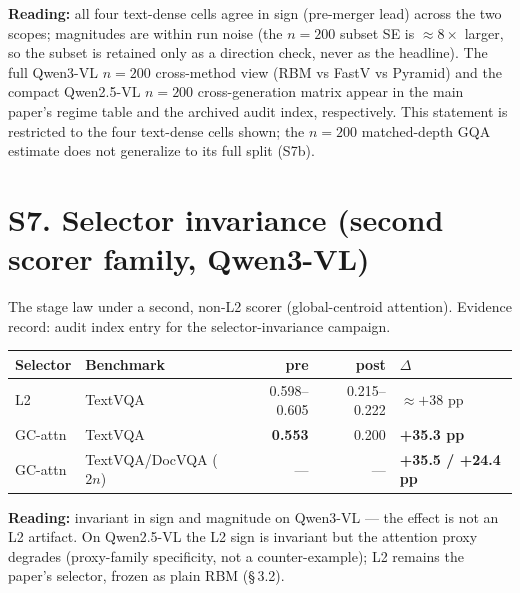 \noindent\textbf{Reading:} all four text-dense cells agree in sign (pre-merger
lead) across the two scopes; magnitudes are within run noise (the $n = 200$
subset SE is $\approx 8\times$ larger, so the subset is retained only as a
direction check, never as the headline). The full Qwen3-VL $n = 200$
cross-method view (RBM vs FastV vs Pyramid) and the compact Qwen2.5-VL
$n = 200$ cross-generation matrix appear in the main paper's regime table and
the archived audit index, respectively. This statement is restricted to the
four text-dense cells shown; the $n=200$ matched-depth GQA estimate does not
generalize to its full split (S7b).

\section*{S7. Selector invariance (second scorer family, Qwen3-VL)}

The stage law under a second, non-L2 scorer (global-centroid attention).
Evidence record: audit index entry for the selector-invariance
campaign.

\begin{table}[ht]
  \centering
  \scriptsize
  \setlength{\tabcolsep}{2pt}
  \begin{tabular}{@{}l l r r l@{}}
    \toprule
    Selector & Benchmark & pre & post & $\Delta$ \\
    \midrule
    L2       & TextVQA              & 0.598--0.605 & 0.215--0.222 & $\approx +38$ pp \\
    GC-attn  & TextVQA              & \textbf{0.553} & 0.200 & \textbf{+35.3 pp} \\
    GC-attn  & TextVQA/DocVQA ($2n$)& --- & --- & \textbf{+35.5 / +24.4 pp} \\
    \bottomrule
  \end{tabular}
\end{table}

\noindent\textbf{Reading:} invariant in sign and magnitude on Qwen3-VL --- the
effect is not an L2 artifact. On Qwen2.5-VL the L2 sign is invariant but the
attention proxy degrades (proxy-family specificity, not a counter-example); L2
remains the paper's selector, frozen as plain RBM (\S\,3.2).

